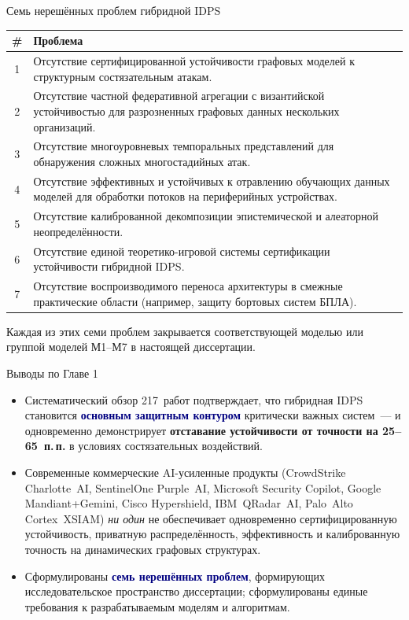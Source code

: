 \documentclass[10pt,aspectratio=169]{beamer}
\newcommand{\hl}[1]{\textcolor{accent}{\textbf{#1}}}
\newcommand{\bn}[1]{\textcolor{navy}{\textbf{#1}}}
\begin{document}
\begin{frame}{Семь нерешённых проблем гибридной IDPS}
\footnotesize
\begin{tabular}{@{}cp{12.4cm}@{}}
\toprule
\# & \textbf{Проблема} \\
\midrule
1 & Отсутствие сертифицированной устойчивости графовых
моделей к структурным состязательным атакам. \\
2 & Отсутствие частной федеративной агрегации с
византийской устойчивостью для разрозненных графовых
данных нескольких организаций. \\
3 & Отсутствие многоуровневых темпоральных представлений
для обнаружения сложных многостадийных атак. \\
4 & Отсутствие эффективных и устойчивых к отравлению
обучающих данных моделей для обработки потоков на
периферийных устройствах. \\
5 & Отсутствие калиброванной декомпозиции эпистемической
и алеаторной неопределённости. \\
6 & Отсутствие единой теоретико-игровой системы
сертификации устойчивости гибридной IDPS. \\
7 & Отсутствие воспроизводимого переноса архитектуры в
смежные практические области (например, защиту бортовых
систем БПЛА). \\
\bottomrule
\end{tabular}
\medskip
\begin{block}{}
\small Каждая из этих семи проблем закрывается
соответствующей моделью или группой моделей М1--М7 в
настоящей диссертации.
\end{block}
\end{frame}

\begin{frame}{Выводы по Главе 1}
\small
\begin{itemize}\setlength\itemsep{4pt}
\item Систематический обзор 217~работ подтверждает, что
гибридная IDPS становится \bn{основным защитным контуром}
критически важных систем~--- и одновременно демонстрирует
\hl{отставание устойчивости от точности на 25--65~п.\,п.}
в условиях состязательных воздействий.
\item Современные коммерческие AI-усиленные продукты
(CrowdStrike Charlotte~AI, SentinelOne Purple~AI,
Microsoft Security Copilot, Google Mandiant+Gemini,
Cisco Hypershield, IBM~QRadar~AI, Palo~Alto Cortex~XSIAM)
\emph{ни один} не обеспечивает одновременно
сертифицированную устойчивость, приватную распределённость,
эффективность и калиброванную точность на динамических
графовых структурах.
\item Сформулированы \bn{семь нерешённых проблем},
формирующих исследовательское пространство диссертации;
сформулированы единые требования к разрабатываемым моделям
и алгоритмам.
\end{itemize}
\end{frame}
\end{document}
